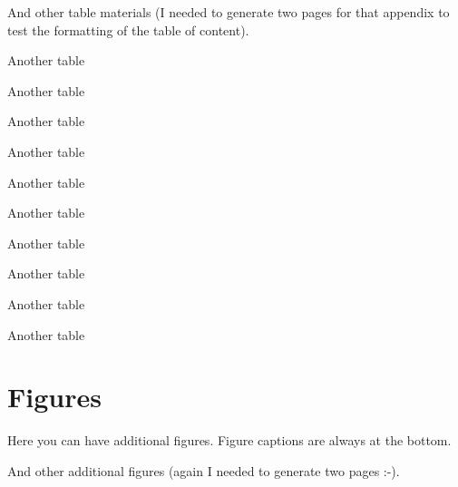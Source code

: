 \documentclass[msc,oneside]{ubcthesis}%
\begin{document}
\newpage
And other table materials (I needed to generate two pages for that appendix to test the formatting of the table of content).

\begin{table}
\caption{Another table}
\end{table}

\begin{table}
\caption{Another table}
\end{table}
\begin{table}
\caption{Another table}
\end{table}
\begin{table}
\caption{Another table}
\end{table}
\begin{table}
\caption{Another table}
\end{table}

\begin{table}
\caption{Another table}
\end{table}
\begin{table}
\caption{Another table}
\end{table}
\begin{table}
\caption{Another table}
\end{table}
\begin{table}
\caption{Another table}
\end{table}
\begin{table}
\caption{Another table}
\end{table}

\chapter{Figures}
Here you can have additional figures. Figure captions are always at the bottom.

\newpage

And other additional figures (again I needed to generate two pages :-).
\end{document}
